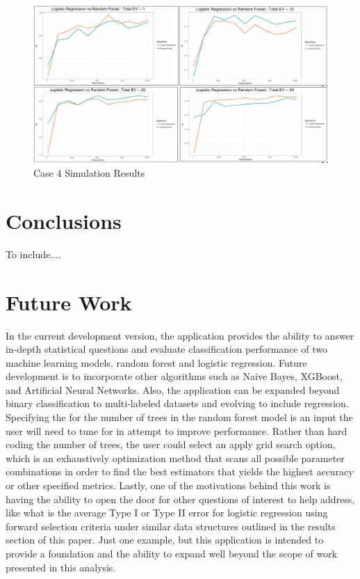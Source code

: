 \documentclass{llncs}
\begin{document}
\begin{figure}
\centering
\includegraphics[scale=0.55]{case4_tpr.png}
\caption{Case 4 Simulation Results}
\label{fig:case4_tpr_results}
\end{figure}

\section{Conclusions}

To include....

\section{Future Work}

In the current development version, the application provides the ability to answer in-depth statistical questions and evaluate classification performance of two machine learning models, random forest and logistic regression. Future development is to incorporate other algorithms such as Naive Bayes, XGBoost, and Artificial Neural Networks. Also, the application can be expanded beyond binary classification to multi-labeled datasets and evolving to include regression. Specifying the for the number of trees in the random forest model is an input the user will need to tune for in attempt to improve performance. Rather than hard coding the number of trees, the user could select an apply grid search option, which is an exhaustively optimization method that scans all possible parameter combinations in order to find the best estimators that yields the highest accuracy or other specified metrics. Lastly, one of the motivations behind this work is having the ability to open the door for other questions of interest to help address, like what is the average Type I or Type II error for logistic regression using forward selection criteria under similar data structures outlined in the results section of this paper. Just one example, but this application is intended to provide a foundation and the ability to expand well beyond the scope of work presented in this analysis.
\end{document}
